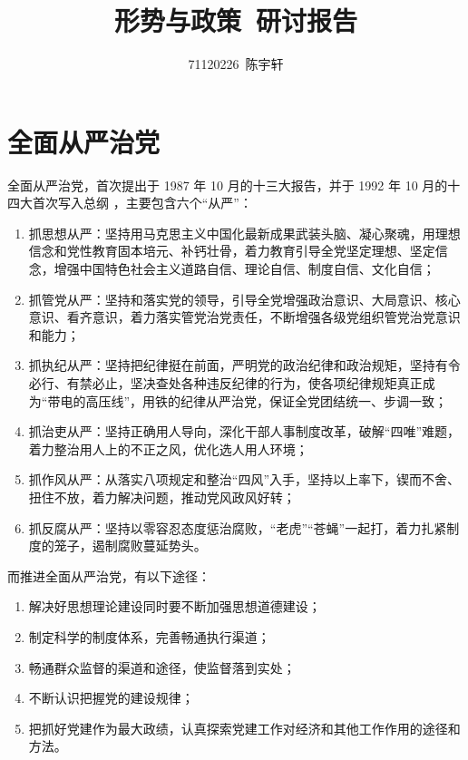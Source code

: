 \documentclass[12pt]{ctexrep}
\author{71120226~陈宇轩}
\title{形势与政策~研讨报告}
\begin{document}
    \maketitle

    \chapter{全面从严治党}

    全面从严治党，首次提出于 1987 年 10 月的十三大报告，并于 1992 年 10 月的十四大首次写入总纲 \cite{cit1.1}，主要包含六个“从严”：
    \begin{enumerate}
        \item 抓思想从严：坚持用马克思主义中国化最新成果武装头脑、凝心聚魂，用理想信念和党性教育固本培元、补钙壮骨，着力教育引导全党坚定理想、坚定信念，增强中国特色社会主义道路自信、理论自信、制度自信、文化自信；
        \item 抓管党从严：坚持和落实党的领导，引导全党增强政治意识、大局意识、核心意识、看齐意识，着力落实管党治党责任，不断增强各级党组织管党治党意识和能力；
        \item 抓执纪从严：坚持把纪律挺在前面，严明党的政治纪律和政治规矩，坚持有令必行、有禁必止，坚决查处各种违反纪律的行为，使各项纪律规矩真正成为“带电的高压线”，用铁的纪律从严治党，保证全党团结统一、步调一致；
        \item 抓治吏从严：坚持正确用人导向，深化干部人事制度改革，破解“四唯”难题，着力整治用人上的不正之风，优化选人用人环境；
        \item 抓作风从严：从落实八项规定和整治“四风”入手，坚持以上率下，锲而不舍、扭住不放，着力解决问题，推动党风政风好转；
        \item 抓反腐从严：坚持以零容忍态度惩治腐败，“老虎”“苍蝇”一起打，着力扎紧制度的笼子，遏制腐败蔓延势头。
    \end{enumerate}

    而推进全面从严治党，有以下途径：\cite{cit1.2}
    \begin{enumerate}
        \item 解决好思想理论建设同时要不断加强思想道德建设；
        \item 制定科学的制度体系，完善畅通执行渠道；
        \item 畅通群众监督的渠道和途径，使监督落到实处；
        \item 不断认识把握党的建设规律；
        \item 把抓好党建作为最大政绩，认真探索党建工作对经济和其他工作作用的途径和方法。
    \end{enumerate}
\end{document}
